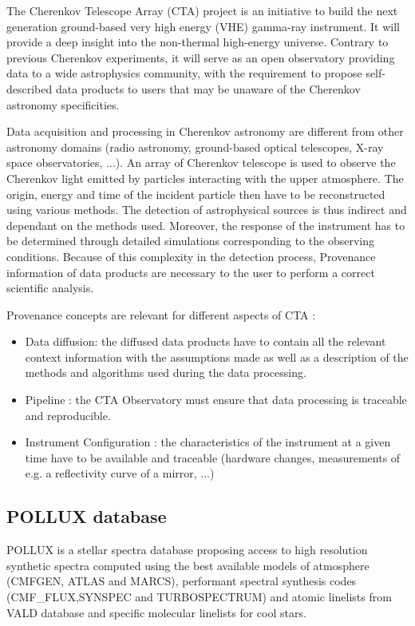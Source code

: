 The Cherenkov Telescope Array (CTA) project is an initiative to build the next generation ground-based very high energy (VHE) gamma-ray instrument. It will provide a deep insight into the non-thermal high-energy universe. Contrary to previous Cherenkov experiments, it will serve as an open observatory providing data to a wide astrophysics community, with the requirement to propose self-described data products to users that may be unaware of the Cherenkov astronomy specificities.

Data acquisition and processing in Cherenkov astronomy are different from other astronomy domains (radio astronomy, ground-based optical telescopes, X-ray space observatories, ...). An array of Cherenkov telescope is used to observe the Cherenkov light emitted by particles interacting with the upper atmosphere. The origin, energy and time of the incident particle then have to be reconstructed using various methods. The detection of astrophysical sources is thus indirect and dependant on the methods used. Moreover, the response of the instrument has to be determined through detailed simulations corresponding to the observing conditions. Because of this complexity in the detection process, Provenance information of data products are necessary to the user to  perform a correct scientific analysis.

Provenance concepts are relevant for different aspects of CTA :
\begin{itemize}
\item Data diffusion: the diffused data products have to contain all the relevant context information with the assumptions made as well as a description of the methods and algorithms used during the data processing.
\item Pipeline : the CTA Observatory must ensure that data processing is traceable and reproducible.
\item Instrument Configuration : the characteristics of the instrument at a given time have to be available and traceable (hardware changes, measurements of e.g. a reflectivity curve of a mirror, ...)
\end{itemize}


\subsection{POLLUX database}

POLLUX is a stellar spectra database proposing access to high resolution synthetic spectra computed using the best available models of atmosphere (CMFGEN, ATLAS and MARCS), performant spectral synthesis codes (CMF\_FLUX,SYNSPEC and TURBOSPECTRUM) and atomic linelists from VALD database and specific molecular linelists for cool stars. 

